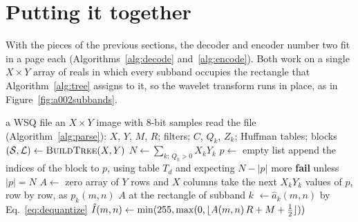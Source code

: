 \section{Putting it together}
\label{sec:decoding}

With the pieces of the previous sections, the decoder and encoder number two fit in a page each
(Algorithms~\ref{alg:decode} and~\ref{alg:encode}). Both work on a single $X\times Y$ array of
reals in which every subband occupies the rectangle that Algorithm~\ref{alg:tree} assigns to
it, so the wavelet transform runs in place, as in Figure~\ref{fig:a002subbands}.

\begin{algorithm}[ht]
  \caption{The WSQ decoder.}
  \label{alg:decode}
  \begin{algorithmic}[1]
    \Require a WSQ file
    \Ensure an $X \times Y$ image with 8-bit samples
    \State read the file (Algorithm~\ref{alg:parse}): $X$, $Y$, $M$, $R$; filters; $C$, $Q_k$, $Z_k$; Huffman tables; blocks
    \State $(\mathcal{S}, \mathcal{L}) \gets \Call{BuildTree}{X, Y}$ 
    \State $N \gets \sum_{k:\,Q_k > 0} X_kY_k$ 
    \State $p \gets$ empty list
      \State append the indices of the block to $p$, using table $T_d$ and expecting $N - |p|$ more 
    \EndFor
    \State \textbf{fail} unless $|p| = N$
    \State $A \gets$ zero array of $Y$ rows and $X$ columns
      \State take the next $X_kY_k$ values of $p$, row by row, as $p_k(m,n)$
      \State $A$ at the rectangle of subband $k$ $\gets \hat a_k(m,n)$ by Eq.~\eqref{eq:dequantize}
    \EndFor
    \State {} 
    \State $\hat I(m,n) \gets \min(255, \max(0, \lfloor A(m,n)\,R + M + \frac12 \rfloor))$ 
  \end{algorithmic}
\end{algorithm}


